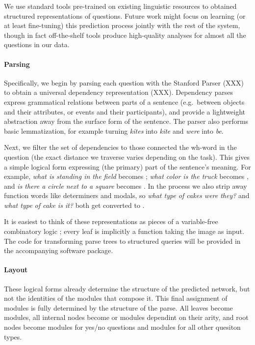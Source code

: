 We use standard tools pre-trained on existing linguistic resources to obtained
structured representations of questions. Future work might focus on learning (or
at least fine-tuning) this prediction process jointly with the rest of the
system, though in fact off-the-shelf tools produce high-quality analyses for
almost all the questions in our data.

\paragraph{Parsing}
Specifically, we begin by parsing each question with the Stanford Parser (XXX)
to obtain a universal dependency representation (XXX). Dependency parses express
grammatical relations between parts of a sentence (e.g.\ between objects and
their attributes, or events and their participants), and provide a lightweight
abstraction away from the surface form of the sentence. The parser also performs
basic lemmatization, for example turning \emph{kites} into \emph{kite} and
\emph{were} into \emph{be}. 

Next, we filter the set of dependencies to those connected the wh-word in the
question (the exact distance we traverse varies depending on the task). This
gives a simple logical form expressing (the primary) part of the sentence's
meaning.  For example, \emph{what is standing in the field} becomes
; \emph{what color is the truck} becomes ,
and \emph{is there a circle next to a square} becomes .
In the process we also strip away function words like determiners and
modals, so \emph{what type of cakes were they?} and \emph{what type of cake is
it?} both get converted to .

It is easiest to think of these representations as pieces of a variable-free
combinatory logic \cite{Liang13DCS}; every leaf is implicitly a function taking
the image as input. The code for transforming parse trees to structured queries
will be provided in the accompanying software package.

\paragraph{Layout}
These logical forms already determine the structure of the predicted network,
but not the identities of the modules that compose it. This final assignment of
modules is fully determined by the structure of the parse. All leaves become
 modules, all internal nodes become  or 
modules dependint on their arity, and root nodes become  modules
for yes/no questions and  modules for all other quesiton types.

